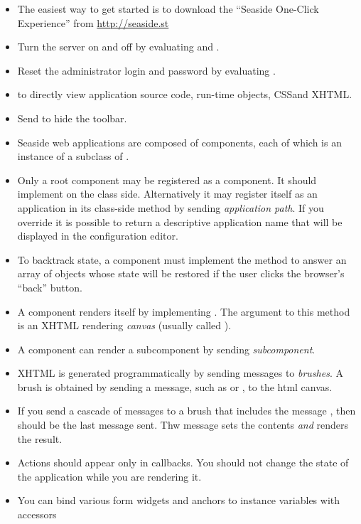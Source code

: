 \documentclass[a4paper,10pt,twoside]{book}
\begin{document}
\begin{itemize}
\item The easiest way to get started is to download the ``Seaside One-Click Experience''
from \url{http://seaside.st}
\item Turn the server on and off by evaluating  and .
\item Reset the administrator login and password by evaluating .
\item {} to directly view application source code, run-time objects, CSSand XHTML.
  \item Send  to hide the toolbar.
\item Seaside web applications are composed of components, each of which is an instance
of a subclass of .
\item Only a root component may be registered as a component. It should implement
 on the class side. Alternatively it may register itself as an application
in its class-side  method by sending 
\emph{application path}.
If you override  it is possible to return a descriptive application name
that will be displayed in the configuration editor.
\item To backtrack state, a component must implement the  method to answer an
array of objects whose state will be restored if the user clicks the browser's ``back''
button.
  \item A component renders itself by implementing .
The argument to this method is an XHTML rendering \emph{canvas} (usually called
).
\item A component can render a subcomponent by sending 
\emph{subcomponent}.
\item XHTML is generated programmatically by sending messages to \emph{brushes}. A brush
is obtained by sending a message, such as  or , to the html canvas.\item If you send a cascade of messages to a brush that includes the message ,
then  should be the last message sent.
  Thw  message sets the contents \emph{and} renders the result.
  \item Actions should appear only in callbacks.
You should not change the state of the application while you are rendering it.
\item You can bind various form widgets and anchors to instance variables with accessors

\end{itemize}
\end{document}
